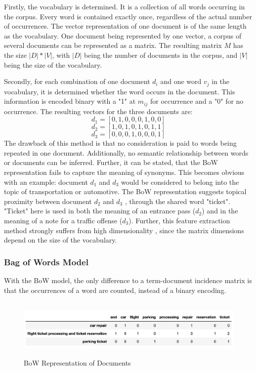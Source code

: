             Firstly, the vocabulary is determined. 
            It is a collection of all words occurring in the corpus. Every word is contained exactly once, regardless of the actual number of occurrences. The vector representation of one document is of the same length as the vocabulary. One document being represented by one vector, a corpus of several documents can be represented as a matrix. The resulting matrix $M$ has the size $ |D|*|V| $, with $|D|$ being the number of documents in the corpus, and $|V|$ being the size of the vocabulary.
            
            Secondly, for each combination of one document $ d_{i} $ and one word $ v_{j} $ in the vocabulary, it is determined whether the word occurs in the document. This information is encoded binary with a "1" at $m_{ij}$ for occurrence and a "0" for no occurrence. The resulting vectors for the three documents are:
            \[ d_{1} = [0,1,0,0,0,1,0,0] \]
            \[ d_{2} = [1,0,1,0,1,0,1,1] \]
            \[ d_{3} = [0,0,0,1,0,0,0,1]\]
    		The drawback of this method is that no consideration is paid to words being repeated in one document. Additionally, no semantic relationship between words or documents can be inferred. 
    		Further, it can be stated, that the \ac{BoW} representation fails to capture the meaning of synonyms. This becomes obvious with an example: document $ d_{1} $ and $ d_{3}$ would be considered to belong into the topic of transportation or automotive. The \ac{BoW} representation suggests topical proximity between document $ d_{2} $ and $ d_{3}$ , through the shared word "ticket". "Ticket" here is used in both the meaning of an entrance pass ($d_{2}$) and in the meaning of a note for a traffic offense  ($d_{3}$). 
    		Further, this feature extraction method strongly suffers from high dimensionality \cite[c.~ I.3.]{practicalNLP}, since the matrix dimensions depend on the size of the vocabulary. 
    
            \subsubsection{Bag of Words Model}
 			With the \ac{BoW} model, the only difference to a term-document incidence matrix is that the occurrences of a word are counted, instead of a binary encoding.
             \begin{figure}[ht]
            	\centering
            	\includegraphics[height=2.9cm]{Bilder/bow.png}
            	\caption{\acl{BoW} Representation of Documents}
            	\label{fig:corpus}
            \end{figure}
            
